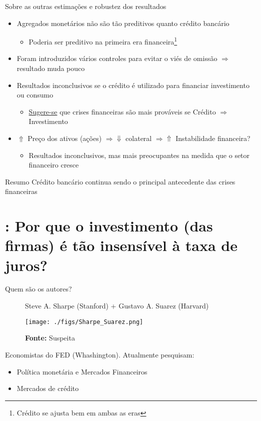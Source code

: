 \documentclass[presentation]{beamer}
\begin{document}
\begin{frame}[label={sec:orgf9d79a9}]{Sobre as outras estimações e robustez dos resultados}
\begin{itemize}
\item Agregados monetários não são tão preditivos quanto crédito bancário
\begin{itemize}
\item Poderia ser preditivo na primeira era financeira\footnote{Crédito se ajusta bem em ambas as eras}
\end{itemize}
\item Foram introduzidos vários controles para evitar o viés de omissão \(\Rightarrow\) resultado muda pouco
\item Resultados inconclusivos se o crédito é utilizado para financiar investimento ou consumo
\begin{itemize}
\item \uline{Sugere-se} que crises financeiras são mais prováveis se Crédito \(\Rightarrow\) Investimento
\end{itemize}
\item \(\Uparrow\) Preço dos ativos (ações) \(\Rightarrow \Downarrow\) colateral \(\Rightarrow \Uparrow\) Instabilidade financeira?
\begin{itemize}
\item Resultados inconclusivos, mas mais preocupantes na medida que o setor financeiro cresce
\end{itemize}
\end{itemize}


\begin{block}{Resumo}
Crédito bancário continua sendo o principal antecedente das crises financeiras
\end{block}
\end{frame}

\section{\textcite{sharpe_2020_Why}: Por que o investimento (das firmas) é tão insensível à taxa de juros?}
\label{sec:org3e61b16}

\begin{frame}[label={sec:org0d2dfc7}]{Quem são os autores?}
\begin{figure}[htb]
\centering
\caption{Steve A. Sharpe (Stanford) + Gustavo A. Suarez (Harvard)}
\texttt{[image: ./figs/Sharpe\_Suarez.png]}
\label{fig:autores01}
\caption*{\textbf{Fonte:} Suspeita}
\end{figure}

Economistas do FED (Whashington). Atualmente pesquisam:

\begin{itemize}
\item Política monetária e Mercados Financeiros
\item Mercados de crédito
\end{itemize}
\end{frame}
\end{document}
